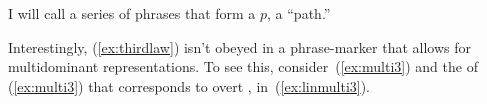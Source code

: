 \documentclass[output=paper]{langsci/langscibook}
\begin{document}
I will call a series of phrases that form a $p$, a ``path.''

Interestingly, (\ref{ex:thirdlaw}) isn't obeyed in a phrase-marker that allows
for multidominant representations. To see this, consider~(\ref{ex:multi3}) and
the  of (\ref{ex:multi3}) that corresponds to overt ,
in~(\ref{ex:linmulti3}).

\ea\label{ex:multi3}
\z
%
\end{document}
